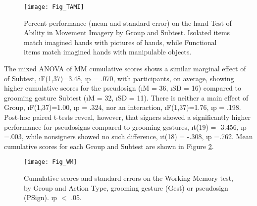             \begin{figure}[!h] \centering
                \texttt{[image: Fig\_TAMI]} 
 
                \caption[TAMI-h means by Group and Subtest]{Percent performance (mean and standard error) on the hand Test of Ability in Movement Imagery by Group and Subtest. Isolated items match imagined hands with pictures of hands, while Functional items match imagined hands with manipulable objects.} \label{fig:tami} \end{figure} 

 
            
            The mixed ANOVA of MM cumulative scores shows a similar marginal effect of of Subtest, \i{F}(1,37)=3.48, \i{p} = .070, with participants, on average, showing higher cumulative scores for the pseudosign (\i{M} = 36, \i{SD} = 16) compared to grooming gesture Subtest (\i{M} = 32, \i{SD} = 11). There is neither a main effect of Group, \i{F}(1,37)=1.00, \i{p} = .324, nor an interaction, \i{F}(1,37)=1.76, \i{p} = .198. Post-hoc paired t-tests reveal, however, that signers showed a significantly higher performance for pseudosigns compared to grooming gestures, \i{t}(19) = -3.456, \i{p} =.003, while nonsigners showed no such difference, \i{t}(18) = -.308, \i{p} =.762. Mean cumulative scores for each Group and Subtest are shown in Figure \ref{fig:wm}. \par

 

            \begin{figure}[!h] \centering 
                \texttt{[image: Fig\_WM]} 
 
                \caption[Working memory cumulative scores by Group and Subtest]{Cumulative scores and standard errors on the Working Memory test, by Group and Action Type, grooming gesture (Gest) or pseudosign (PSign). \oneS \i{p} $<$ .05.} \label{fig:wm}
            \end{figure} 
